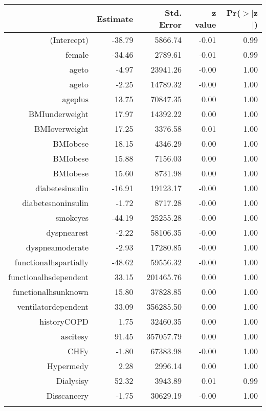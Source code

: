 \bigskip\bigskip
\centering
\begin{tabular}{rrrrr}
  \hline
 & Estimate & Std. Error & z value & Pr($>$$|$z$|$) \\ 
  \hline
(Intercept) & -38.79 & 5866.74 & -0.01 & 0.99 \\ 
  female & -34.46 & 2789.61 & -0.01 & 0.99 \\ 
  age\-65\-to\-74 & -4.97 & 23941.26 & -0.00 & 1.00 \\ 
  age\-75\-to\-84 & -2.25 & 14789.32 & -0.00 & 1.00 \\ 
  age\-85\-plus & 13.75 & 70847.35 & 0.00 & 1.00 \\ 
  BMI\-underweight & 17.97 & 14392.22 & 0.00 & 1.00 \\ 
  BMI\-overweight & 17.25 & 3376.58 & 0.01 & 1.00 \\ 
  BMI\-obese\-1 & 18.15 & 4346.29 & 0.00 & 1.00 \\ 
  BMI\-obese\-2 & 15.88 & 7156.03 & 0.00 & 1.00 \\ 
  BMI\-obese\-3 & 15.60 & 8731.98 & 0.00 & 1.00 \\ 
  diabetes\-insulin & -16.91 & 19123.17 & -0.00 & 1.00 \\ 
  diabetes\-noninsulin & -1.72 & 8717.28 & -0.00 & 1.00 \\ 
  smoke\-yes & -44.19 & 25255.28 & -0.00 & 1.00 \\ 
  dyspnea\-rest & -2.22 & 58106.35 & -0.00 & 1.00 \\ 
  dyspnea\-moderate & -2.93 & 17280.85 & -0.00 & 1.00 \\ 
  functional\-hs\-partially & -48.62 & 59556.32 & -0.00 & 1.00 \\ 
  functional\-hs\-dependent & 33.15 & 201465.76 & 0.00 & 1.00 \\ 
  functional\-hs\-unknown & 15.80 & 37828.85 & 0.00 & 1.00 \\ 
  ventilator\-dependent & 33.09 & 356285.50 & 0.00 & 1.00 \\ 
  history\-COPD & 1.75 & 32460.35 & 0.00 & 1.00 \\ 
  ascites\-y & 91.45 & 357057.79 & 0.00 & 1.00 \\ 
  CHF\-y & -1.80 & 67383.98 & -0.00 & 1.00 \\ 
  Hyper\-med\-y & 2.28 & 2996.14 & 0.00 & 1.00 \\ 
  Dialysis\-y & 52.32 & 3943.89 & 0.01 & 0.99 \\ 
  Diss\-cancer\-y & -1.75 & 30629.19 & -0.00 & 1.00 \\ 
$$
\end{tabular}
